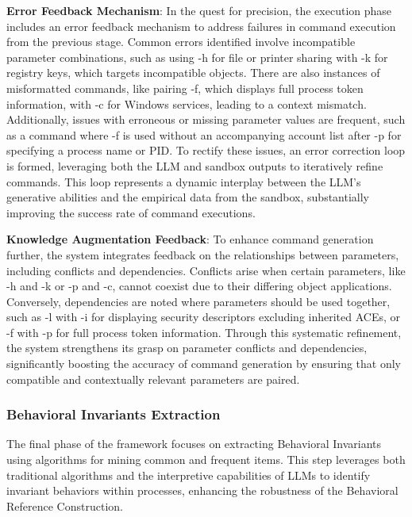 \noindent
{\bf Error Feedback Mechanism}:
In the quest for precision, the execution phase includes an error feedback mechanism to address failures in command execution from the previous stage. Common errors identified involve incompatible parameter combinations, such as using -h for file or printer sharing with -k for registry keys, which targets incompatible objects. There are also instances of misformatted commands, like pairing -f, which displays full process token information, with -c for Windows services, leading to a context mismatch. Additionally, issues with erroneous or missing parameter values are frequent, such as a command where -f is used without an accompanying account list after -p for specifying a process name or PID. To rectify these issues, an error correction loop is formed, leveraging both the LLM and sandbox outputs to iteratively refine commands. This loop represents a dynamic interplay between the LLM's generative abilities and the empirical data from the sandbox, substantially improving the success rate of command executions.

\noindent
{\bf Knowledge Augmentation Feedback}:
To enhance command generation further, the system integrates feedback on the relationships between parameters, including conflicts and dependencies. Conflicts arise when certain parameters, like -h and -k or -p and -c, cannot coexist due to their differing object applications. Conversely, dependencies are noted where parameters should be used together, such as -l with -i for displaying security descriptors excluding inherited ACEs, or -f with -p for full process token information. Through this systematic refinement, the system strengthens its grasp on parameter conflicts and dependencies, significantly boosting the accuracy of command generation by ensuring that only compatible and contextually relevant parameters are paired.



\subsubsection{Behavioral Invariants Extraction}

The final phase of the framework focuses on extracting Behavioral Invariants using algorithms for mining common and frequent items. This step leverages both traditional algorithms and the interpretive capabilities of LLMs to identify invariant behaviors within processes, enhancing the robustness of the Behavioral Reference Construction.


